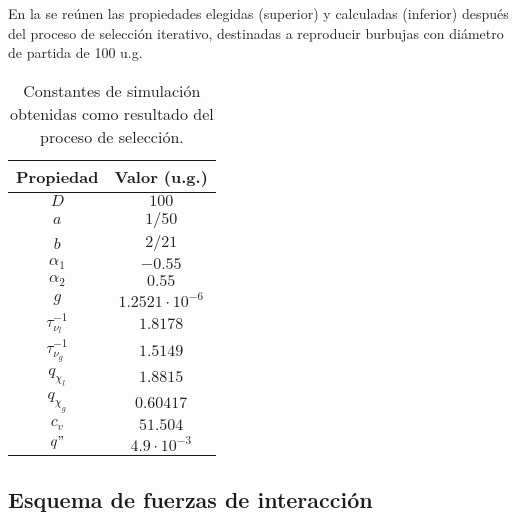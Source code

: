 En la  se re\'unen las propiedades elegidas (superior) y calculadas (inferior) despu\'es del proceso de selecci\'on iterativo, destinadas a reproducir burbujas con di\'ametro de partida de 100 u.g. 

\begin{table}[ht]
	\centering
    \begin{tabular}{c c}
	    \toprule
        \bf Propiedad & \bf Valor (u.g.)\\
        \midrule
        $D$ & $100$ \\
        $a$ & $1/50$ \\
        $b$ & $2/21$ \\
        $\alpha_1$ & $-0.55$ \\
        $\alpha_2$ & $0.55$ \\
        \midrule
		$g$ & $1.2521 \cdot 10^{-6}$\\
		$\tau_{\nu_l}^{-1}$ & $1.8178$\\
		$\tau_{\nu_g}^{-1}$ & $1.5149$ \\
		$q_{\chi_l}$ & $1.8815$ \\
		$q_{\chi_g}$ & $0.60417$ \\
		$c_v$ & $51.504$ \\
		$q"$ & $4.9 \cdot 10^{-3}$ \\
        \bottomrule
	\end{tabular}
	\caption{Constantes de simulaci\'on obtenidas como resultado del proceso de selecci\'on.}
	\label{tab:param_hutter_3D}
\end{table} 
\FloatBarrier



\subsection{Esquema de fuerzas de interacci\'on}

